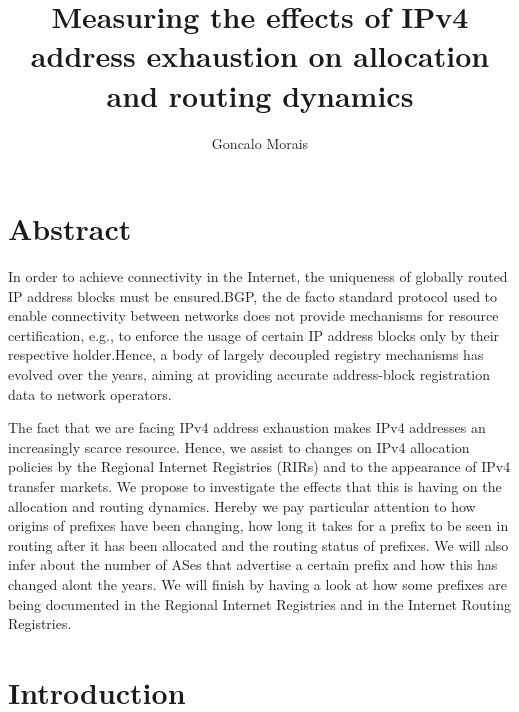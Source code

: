 \documentclass[11pt,a4paper]{scrreprt}
\title{\textbf{Measuring the effects of IPv4 address exhaustion on allocation and routing dynamics}}
\author{Goncalo Morais}
\date{}
\begin{document}
\maketitle

\tableofcontents
\listoffigures
\listoftables

\setcounter{chapter}{0}


\chapter*{Abstract}

In order to achieve connectivity in the Internet, the uniqueness of
globally routed IP address blocks must be ensured.BGP, the de facto
standard protocol used to enable connectivity between networks does not
provide mechanisms for resource certification, e.g., to enforce the
usage of certain IP address blocks only by their respective holder.Hence, a body of largely decoupled registry mechanisms has evolved over
the years, aiming at providing accurate address-block registration data
to network operators.

The fact that we are facing IPv4 address exhaustion makes IPv4 addresses an
increasingly scarce resource. Hence, we assist to changes on IPv4 allocation policies by the Regional Internet Registries (RIRs) and to the appearance of IPv4 transfer markets. We propose to investigate the effects that this is having on the allocation and routing dynamics. Hereby we pay particular attention to how origins of prefixes have been changing, how long it takes for a prefix to be seen in routing after it has been allocated and the routing status of prefixes. We will also infer about the number of ASes that advertise a certain prefix and how this has changed alont the years. We will finish by having a look at how some prefixes are being documented in the Regional Internet Registries and in the Internet Routing Registries. 


\chapter{Introduction}
\end{document}
